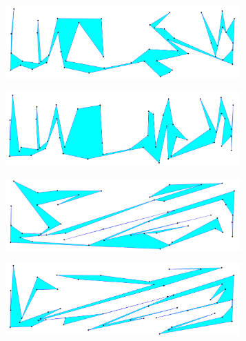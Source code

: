 \documentclass[conference]{IEEEtran}
\begin{document}
		\begin{figure}[htbp]
			\centering
			\begin{subfigure}{0.99\linewidth}
				\centering
				\includegraphics[width=0.99\textwidth]{fig6a.png}
				\caption{}
				\label{fig6a}
			\end{subfigure}
			
			\begin{subfigure}{0.99\linewidth}
				\centering
				\includegraphics[width=0.99\textwidth]{fig6b.png}
				\caption{}
				\label{fig6b}
			\end{subfigure}
			
			\begin{subfigure}{0.99\linewidth}
				\centering
				\includegraphics[width=0.99\textwidth]{fig6c.png}
				\caption{}
				\label{fig6c}
			\end{subfigure}
			
			\begin{subfigure}{0.99\linewidth}
				\centering
				\includegraphics[width=0.99\textwidth]{fig6d.png}
				\caption{}
				\label{fig6d}
			\end{subfigure}
			

\end{figure}
\end{document}
